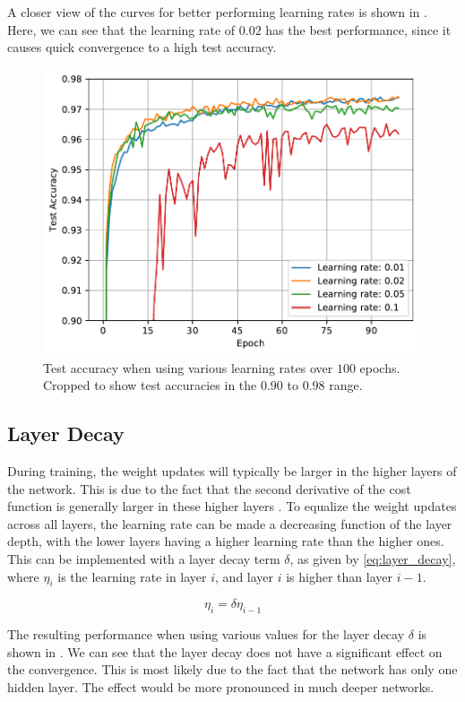 \documentclass[journal,hidelinks]{IEEEtran}
\begin{document}
A closer view of the curves for better performing learning rates is shown in . Here, we can see that the learning rate of $0.02$ has the best performance, since it causes quick convergence to a high test accuracy.

\begin{figure}[!htb]
  \centering
  \includegraphics[width=0.8\columnwidth]{plots/learning_rate_zoom_2.pdf}
  \caption{Test accuracy when using various learning rates over $100$ epochs. Cropped to show test accuracies in the $0.90$ to $0.98$ range.}
  \label{fig:learning_rate_zoom}
\end{figure}

\subsection{Layer Decay}

During training, the weight updates will typically be larger in the higher layers of the network. This is due to the fact that the second derivative of the cost function is generally larger in these higher layers \cite{lecun_efficient_1998}. To equalize the weight updates across all layers, the learning rate can be made a decreasing function of the layer depth, with the lower layers having a higher learning rate than the higher ones. This can be implemented with a layer decay term $\delta$, as given by \cref{eq:layer_decay}, where $\eta_i$ is the learning rate in layer $i$, and layer $i$ is higher than layer $i-1$.

\begin{equation} \label{eq:layer_decay}
\eta_i = \delta \eta_{i-1}
\end{equation}

The resulting performance when using various values for the layer decay $\delta$ is shown in . We can see that the layer decay does not have a significant effect on the convergence. This is most likely due to the fact that the network has only one hidden layer. The effect would be more pronounced in much deeper networks.
\end{document}
